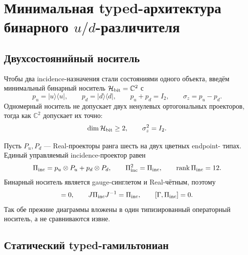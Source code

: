\chapter{Минимальная typed-архитектура бинарного \texorpdfstring{$u/d$}{u/d}-различителя}
\label{ch:v8-up-down-minimal-typed-discriminator}

\section{Двухсостоянийный носитель}

Чтобы два incidence-назначения стали состояниями одного объекта, введём
минимальный бинарный носитель $\mathcal H_{\rm bit}=\mathbb C^2$ с
\begin{equation}
 p_u=|u\rangle\langle u|,\qquad
 p_d=|d\rangle\langle d|,\qquad
 p_u+p_d=I_2,\qquad \sigma_z=p_u-p_d.
 \label{eq:v8-up-down-architecture-bit-projectors}
\end{equation}
Одномерный носитель не допускает двух ненулевых ортогональных проекторов,
тогда как $\mathbb C^2$ допускает их точно:
\begin{equation}
 \dim\mathcal H_{\rm bit}\ge2,\qquad
 \sigma_z^2=I_2.
 \label{eq:v8-up-down-architecture-minimality}
\end{equation}

Пусть $P_u,P_d$ --- Real-проекторы ранга шесть на двух цветных endpoint-
типах. Единый управляемый incidence-проектор равен
\begin{equation}
 \Pi_{\rm inc}=p_u\otimes P_u+p_d\otimes P_d,\qquad
 \Pi_{\rm inc}^2=\Pi_{\rm inc},\qquad \operatorname{rank}\Pi_{\rm inc}=12.
 \label{eq:v8-up-down-architecture-controlled-incidence}
\end{equation}
Бинарный носитель является gauge-синглетом и Real-чётным, поэтому
\begin{equation}
 [\Pi_{\rm inc},I_2\otimes\rho(g)]=0,\qquad
 J\Pi_{\rm inc}J^{-1}=\Pi_{\rm inc},\qquad
 [\Gamma,\Pi_{\rm inc}]=0.
 \label{eq:v8-up-down-architecture-compatibility}
\end{equation}
Так обе прежние диаграммы вложены в один типизированный операторный носитель,
а не сравниваются извне.

\section{Статический typed-гамильтониан}

